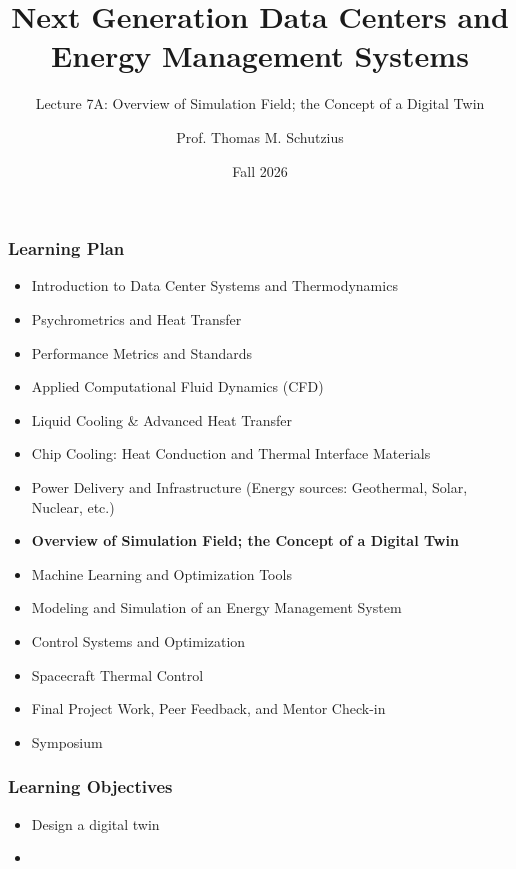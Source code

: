\documentclass[aspectratio=169,10pt,xcolor={table,dvipsnames},t]{beamer}
\title[lecture 07]{Next Generation Data Centers and Energy Management Systems}
\subtitle{Lecture 7A: Overview of Simulation Field; the Concept of a Digital Twin}
\author{Prof. Thomas M. Schutzius}
\institute{Department of Mechanical Engineering}
\date{Fall 2026}
\begin{document}
\begin{frame}
  \titlepage
\end{frame}


{
\smallframetitle %

\begin{frame}
	\frametitle{Learning Plan}
	\begin{itemize}
		\item Introduction to Data Center Systems and Thermodynamics 
		\item Psychrometrics and Heat Transfer
		\item Performance Metrics and Standards
		\item Applied Computational Fluid Dynamics (CFD)
		\item Liquid Cooling \& Advanced Heat Transfer
		\item Chip Cooling: Heat Conduction and Thermal Interface Materials
		\item Power Delivery and Infrastructure (Energy sources: Geothermal, Solar, Nuclear, etc.)
		\item \textbf{Overview of Simulation Field; the Concept of a Digital Twin}
		\item Machine Learning and Optimization Tools 
		\item Modeling and Simulation of an Energy Management System 
		\item Control Systems and Optimization 
		\item Spacecraft Thermal Control
		\item Final Project Work, Peer Feedback, and Mentor Check-in 
		\item Symposium 
	\end{itemize}		
\end{frame}

\begin{frame}
	\frametitle{Learning Objectives} 
		\begin{itemize}
			\item Design a digital twin
			\item 
		\end{itemize}		
\end{frame}


}
\end{document}
